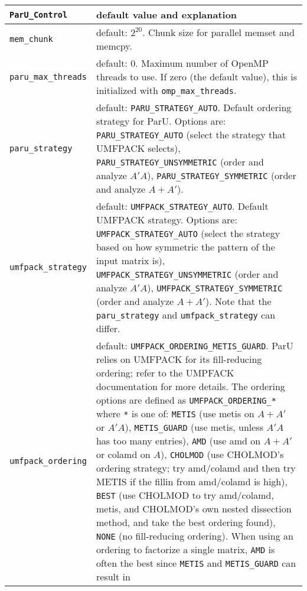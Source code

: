\documentclass[12pt]{article}
\begin{document}
    \vspace{0.1in}
    \hspace{-0.2in}
    {\footnotesize
    \begin{tabular}{|lp{4.7in}|}
    \hline
    \verb'ParU_Control' & default value and explanation  \\
    \hline\hline
    \verb'mem_chunk' & default: $2^{20}$. Chunk size for parallel memset and
        memcpy. \\
    \verb'paru_max_threads' & default: $0$.  Maximum number of OpenMP threads
        to use.  If zero (the default value), this is initialized with
        \verb'omp_max_threads'. \\
    \hline
    \verb'paru_strategy' & default: \verb'PARU_STRATEGY_AUTO'. Default ordering
        strategy for ParU.  Options are:
        \verb'PARU_STRATEGY_AUTO' (select the strategy that UMFPACK selects),
        \verb'PARU_STRATEGY_UNSYMMETRIC' (order and analyze $A'A$),
        \verb'PARU_STRATEGY_SYMMETRIC' (order and analyze $A+A'$).
        \\
    \verb'umfpack_strategy' & default: \verb'UMFPACK_STRATEGY_AUTO'.
        Default UMFPACK strategy. Options are:
        \verb'UMFPACK_STRATEGY_AUTO' (select the strategy based on how
            symmetric the pattern of the input matrix is),
        \verb'UMFPACK_STRATEGY_UNSYMMETRIC' (order and analyze $A'A$),
        \verb'UMFPACK_STRATEGY_SYMMETRIC' (order and analyze $A+A'$).
        Note that the \verb'paru_strategy' and \verb'umfpack_strategy' can
        differ.
        \\
    \verb'umfpack_ordering' & default: \verb'UMFPACK_ORDERING_METIS_GUARD'.
        ParU relies on UMFPACK for its fill-reducing ordering;  refer to the
        UMPFACK documentation for more details.
        The ordering options are defined as \verb'UMFPACK_ORDERING_*' where
        \verb'*' is one of:
        \verb'METIS' (use metis on $A+A'$ or $A'A$),
        \verb'METIS_GUARD' (use metis, unless $A'A$ has too many entries),
        \verb'AMD' (use amd on $A+A'$ or colamd on $A$),
        \verb'CHOLMOD' (use CHOLMOD's ordering strategy; try amd/colamd and
            then try METIS if the fillin from amd/colamd is high),
        \verb'BEST' (use CHOLMOD to try amd/colamd, metis, and CHOLMOD's own
            nested dissection method, and take the best ordering found),
        \verb'NONE' (no fill-reducing ordering).
        When using an ordering to factorize a single matrix, \verb'AMD' is
        often the best since \verb'METIS' and \verb'METIS_GUARD' can result in

\end{tabular}}
\end{document}
